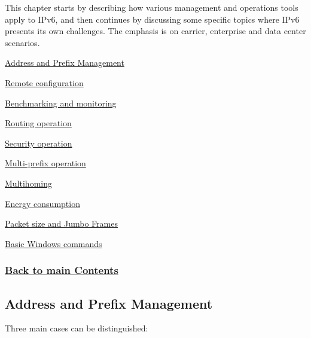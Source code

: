 \documentclass[
]{article}
\begin{document}
This chapter starts by describing how various management and operations
tools apply to IPv6, and then continues by discussing some specific
topics where IPv6 presents its own challenges. The emphasis is on
carrier, enterprise and data center scenarios.

\hyperref[address-and-prefix-management]{Address and Prefix Management}

\hyperref[remote-configuration]{Remote configuration}

\hyperref[benchmarking-and-monitoring]{Benchmarking and monitoring}

\hyperref[routing-operation]{Routing operation}

\hyperref[security-operation]{Security operation}

\hyperref[multi-prefix-operation]{Multi-prefix operation}

\hyperref[multihoming]{Multihoming}

\hyperref[energy-consumption]{Energy consumption}

\hyperref[packet-size-and-jumbo-frames]{Packet size and Jumbo Frames}

\hyperref[basic-windows-commands]{Basic Windows commands}

\subsubsection{\texorpdfstring{\hyperref[list-of-contents]{Back to main
Contents}}{Back to main Contents}}\label{back-to-main-contents-5}

\pagebreak

\subsection{Address and Prefix
Management}\label{address-and-prefix-management}

Three main cases can be distinguished:
\end{document}

